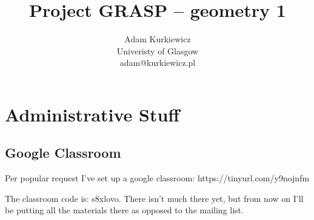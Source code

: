 \documentclass{article}
\title{Project GRASP -- geometry 1}
\author{Adam Kurkiewicz\\
  \small{Univeristy of Glasgow}\\
  \small{adam@kurkiewicz.pl}}
\begin{document}
  \maketitle
  \section{Administrative Stuff}
  
  \subsection{Google Classroom}
  Per popular request I've set up a google classroom: https://tinyurl.com/y9nojnfm
  
  The classroom code is: s8xlovo. There isn't much there yet, but from now on I'll be putting all the materials there as opposed to the mailing list.
  
\end{document}
